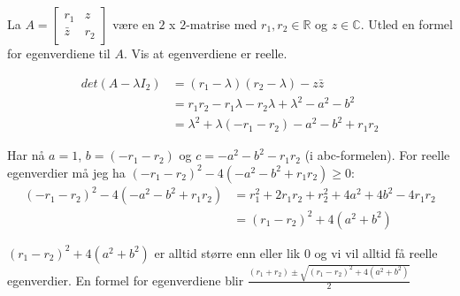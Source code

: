 \documentclass[11pt, a4paper, norsk]{NTNUoving}
\begin{document}
    \begin{oppgave}
        La $A = \begin{bmatrix}
            r_1 & z \\
            \bar{z} & r_2
        \end{bmatrix}$ være en $2$ x $2$-matrise med $r_1, r_2 \in \mathbb{R}$ og $z \in \mathbb{C}$. Utled en formel for egenverdiene til $A$. Vis at egenverdiene er reelle.

        \begin{align*}
            det(A - \lambda I_2) &= (r_1 - \lambda)(r_2 - \lambda) - z\bar{z}
            \\
                                 &= r_1r_2-r_1\lambda-r_2\lambda+\lambda^2-a^2-b^2 \\
                                 &= \lambda^2 + \lambda(-r_1-r_2) - a^2 - b^2 + r_1r_2
        \end{align*}

        Har nå $a = 1$, $b = (-r_1-r_2)$ og $c = -a^2 - b^2 - r_1r_2$ (i abc-formelen). For reelle egenverdier må jeg ha $(-r_1-r_2)^2 -4(-a^2-b^2+r_1r_2) \geq 0$:
        \begin{align*}
            (-r_1-r_2)^2 -4(-a^2-b^2+r_1r_2) &= r_{1}^2 + 2r_1r_2 + r_{2}^2 +4a^2 + 4b^2 - 4r_1r_2
            \\
                                             &= (r_1-r_2)^2 +4(a^2+b^2)
        \end{align*}
        
        $(r_1-r_2)^2 +4(a^2+b^2)$ er alltid større enn eller lik $0$ og vi vil alltid få reelle egenverdier. En formel for egenverdiene blir $\frac{(r_1+r_2) \pm \sqrt{(r_1-r_2)^2 + 4(a^2+b^2)}}{2}$ 
    \end{oppgave}
\end{document}
